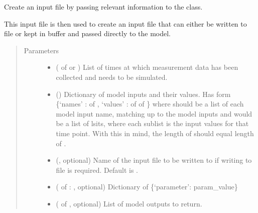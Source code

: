 \documentclass[letterpaper,10pt,english]{sphinxmanual}
\begin{document}
\begin{fulllineitems}
\label{\detokenize{bcmdModel:bayescmd.bcmdModel.InputCreator}}
Create an input file by passing relevant information to the class.

This input file is then used to create an input file that can either be
written to file or kept in buffer and passed directly to the model.
\begin{quote}\begin{description}
\item[{Parameters}] \leavevmode\begin{itemize}
\item {} 
 ( of  or ) \textendash{} List of times at which measurement data has been collected and needs
to be simulated.

\item {} 
 () \textendash{} Dictionary of model inputs and their values. Has form
\{‘names’ :  of ,
‘values’ :  of  of \}
where  should be a list of each model input name, matching up to
the model inputs and  would be a list of lsits, where each
sublist is the input values for that time point. With this in mind,
the length of  should equal length of .

\item {} 
 (, optional) \textendash{} Name of the input file to be written to if writing to file is required.
Default is .

\item {} 
 ( of : , optional) \textendash{} Dictionary of \{‘parameter’: param\_value\}

\item {} 
 ( of , optional) \textendash{} List of model outputs to return.

\end{itemize}


\end{description}
\end{quote}
\end{fulllineitems}
\end{document}
